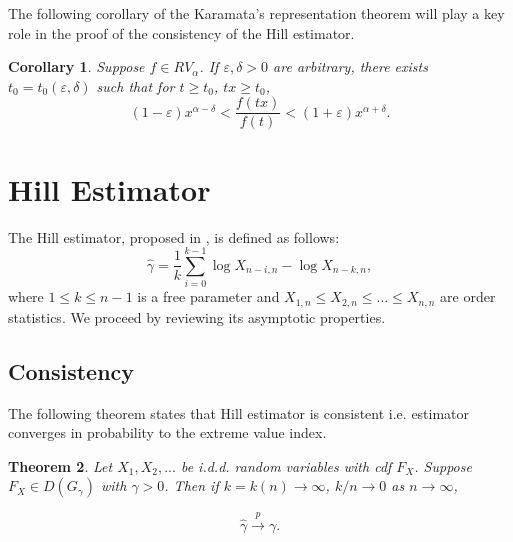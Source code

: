 \documentclass[english,12pt,a4paper,pdftex,sci,utf8]{aaltothesis} %
\newtheorem{theorem}{Theorem}[section]
\newtheorem{corollary}[theorem]{Corollary}
\begin{document}
The following corollary \cite{potter} of the Karamata’s representation theorem will play a key role in the proof of the consistency of the Hill estimator. 

\begin{corollary}
Suppose $f \in RV_{\alpha}$. If $\varepsilon, \delta>0$ are arbitrary, there exists $t_0=t_0(\varepsilon, \delta)$ such that for $t\geq t_0$, $tx \geq t_0$,
\begin{equation*}
(1-\varepsilon)x^{\alpha-\delta}<\frac{f(tx)}{f(t)}<(1+\varepsilon)x^{\alpha+\delta}.
\end{equation*}
\label{inequality}
\end{corollary}



\clearpage

\section{Hill Estimator}
\label{hillEst}


The Hill estimator, proposed in \cite{hill}, is defined as follows:
\begin{equation*}
\hat{\gamma} = \frac{1}{k} \sum_{i=0}^{k-1} \log X_{n-i,n} - \log X_{n-k,n}, 
\end{equation*}
where $1 \leq k \leq n-1$ is a free parameter and $X_{1,n} \leq X_{2,n} \leq ...  \leq X_{n,n}$ are order statistics. We proceed by reviewing its asymptotic properties.

\subsection{Consistency}

The following theorem states that Hill estimator is consistent i.e. estimator converges in probability to the extreme value index. \cite{mason}


\begin{theorem}
Let $X_1, X_2,...$ be i.d.d. random variables with cdf $F_X$. Suppose $F_X \in D(G_{\gamma})$ with $\gamma > 0$. Then if $k=k(n)  \rightarrow \infty$, $k/n \rightarrow 0$ as $n \rightarrow \infty$,

\begin{equation*}
\hat{\gamma} \xrightarrow{p} \gamma.
\end{equation*}
\label{hillcons}
\end{theorem}
\end{document}
